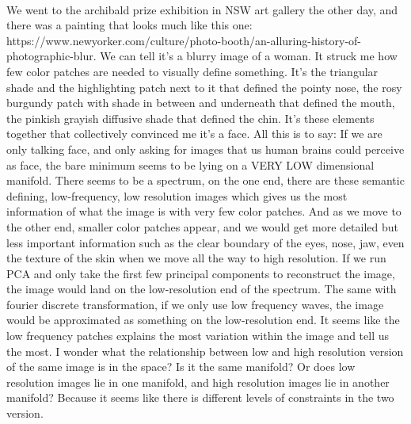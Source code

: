\documentclass{article}
\begin{document}
\paragraph{}
We went to the archibald prize exhibition in NSW art gallery the other day, and there was a painting that looks much like this one: https://www.newyorker.com/culture/photo-booth/an-alluring-history-of-photographic-blur. We can tell it's a blurry image of a woman. It struck me how few color patches are needed to visually define something. It's the triangular shade and the highlighting patch next to it that defined the pointy nose, the rosy burgundy patch with shade in between and underneath that defined the mouth, the pinkish grayish diffusive shade that defined the chin. It's these elements together that collectively convinced me it's a face. All this is to say:  If we are only talking face, and only asking for images that us human brains could perceive as face, the bare minimum seems to be lying on a VERY LOW dimensional manifold. There seems to be a spectrum, on the one end, there are these semantic defining, low-frequency, low resolution images which gives us the most information of what the image is with very few color patches. And as we move to the other end, smaller color patches appear, and we would get more detailed but less important information such as the clear boundary of the eyes, nose, jaw, even the texture of the skin when we move all the way to high resolution. If we run PCA and only take the first few principal components to reconstruct the image, the image would land on the low-resolution end of the spectrum. The same with fourier discrete transformation, if we only use low frequency waves, the image would be approximated as something on the low-resolution end. It seems like the low frequency patches explains the most variation within the image and tell us the most. I wonder what the relationship between low and high resolution version of the same image is in the space? Is it the same manifold? Or does low resolution images lie in one manifold, and high resolution images lie in another manifold? Because it seems like there is different levels of constraints in the two version.
\end{document}
